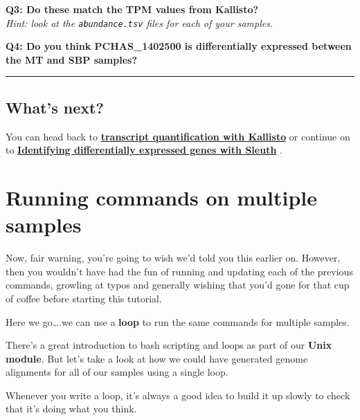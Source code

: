 \documentclass[11pt]{article}
\begin{document}
\textbf{Q3: Do these match the TPM values from Kallisto?}\\
\textit{Hint: look at the \texttt{abundance.tsv} files for each of your
samples.}

\textbf{Q4: Do you think PCHAS\_1402500 is differentially expressed
between the MT and SBP samples?}

    \begin{center}\rule{0.5\linewidth}{.4pt}\end{center}

    \hypertarget{whats-next}{%
\subsection{What's next?}\label{whats-next}}

You can head back to
\textbf{\href{transcript-quantification.ipynb}{transcript quantification
with Kallisto} } or continue on to
\textbf{\href{sleuth-de.ipynb}{Identifying differentially expressed
genes with Sleuth} }.





\newpage





    \hypertarget{running-commands-on-multiple-samples}{%
\section{Running commands on multiple
samples}\label{running-commands-on-multiple-samples}}

    Now, fair warning, you're going to wish we'd told you this earlier on.
However, then you wouldn't have had the fun of running and updating each
of the previous commands, growling at typos and generally wishing that
you'd gone for that cup of coffee before starting this tutorial.

Here we go\ldots.we can use a \textbf{loop} to run the same commands for
multiple samples.

There's a great introduction to bash scripting and loops as part of our
\textbf{Unix module}. But let's take a look at how we could have
generated genome alignments for all of our samples using a single loop.

Whenever you write a loop, it's always a good idea to build it up slowly
to check that it's doing what you think.
\end{document}
